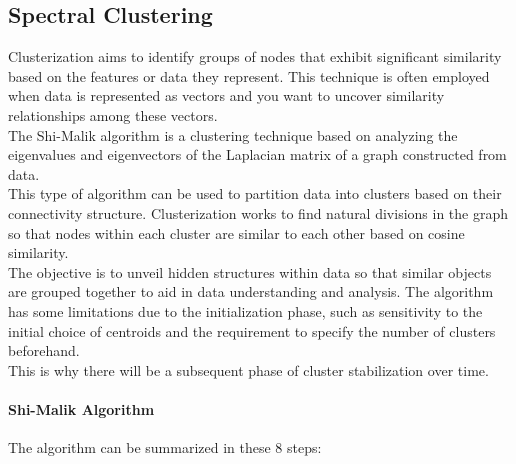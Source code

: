 \subsection{Spectral Clustering}
Clusterization aims to identify groups of nodes that exhibit significant similarity based on the features or data they represent.
This technique is often employed when data is represented as vectors and you want to uncover similarity relationships among these vectors.\\
The Shi-Malik algorithm is a clustering technique based on analyzing the eigenvalues and eigenvectors of the Laplacian matrix of a graph constructed from data.\\
This type of algorithm can be used to partition data into clusters based on their connectivity structure.
Clusterization works to find natural divisions in the graph so that nodes within each cluster are similar to each other based on cosine similarity. \\
The objective is to unveil hidden structures within data so that similar objects are grouped together to aid in data understanding and analysis.
The algorithm has some limitations due to the initialization phase, such as sensitivity to the initial choice of centroids and the requirement to specify the number of clusters beforehand.\\
This is why there will be a subsequent phase of cluster stabilization over time.

\paragraph{Shi-Malik Algorithm} The algorithm can be summarized in these 8 steps:

